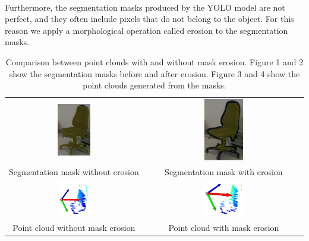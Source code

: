 \hfill
\\Furthermore, the segmentation masks produced by the YOLO model are not perfect, and they often include pixels that do not belong to the object.
For this reason we apply a morphological operation called erosion to the segmentation masks.

\begin{table}[htbp]
    \centering
    \begin{tabular}{cc}
        \includegraphics[width=0.25\textwidth]{figs/mask_no_erosion.png} & \includegraphics[width=0.25\textwidth]{figs/mask_erosion.png} \\
        \small Segmentation mask without erosion & \small Segmentation mask with erosion \\
        \includegraphics[width=0.25\textwidth]{figs/pc_no_erosion.png} & \includegraphics[width=0.25\textwidth]{figs/pc_erosion.png} \\
        \small Point cloud without mask erosion & \small Point cloud with mask erosion \\
    \end{tabular}
    \caption{Comparison between point clouds with and without mask erosion. Figure 1 and 2 show the segmentation masks before and after erosion. Figure 3 and 4 show the point clouds generated from the masks.}
    \label{fig:erosion_comparison}
\end{table}


